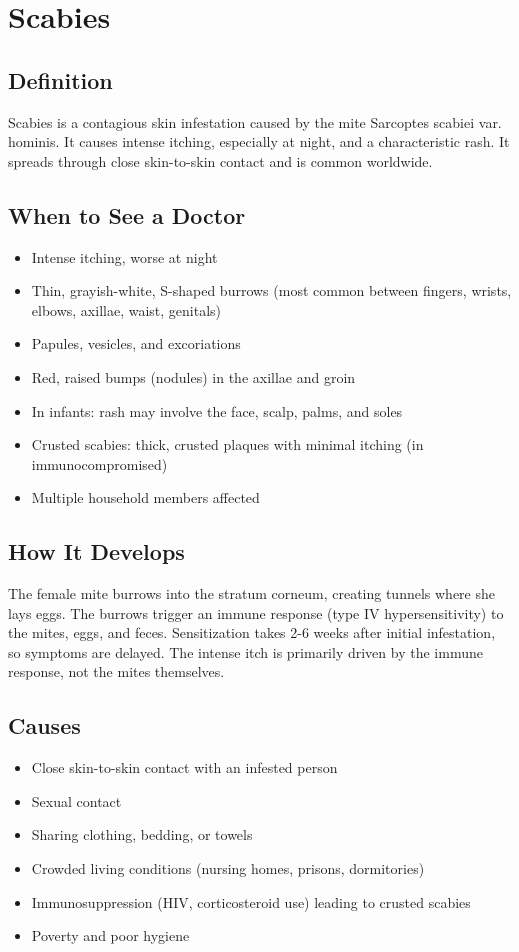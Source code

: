 \chapter{Scabies}

\section*{Definition}
Scabies is a contagious skin infestation caused by the mite Sarcoptes scabiei var. hominis. It causes intense itching, especially at night, and a characteristic rash. It spreads through close skin-to-skin contact and is common worldwide.

\section*{When to See a Doctor}
\begin{itemize}
\item Intense itching, worse at night
\item Thin, grayish-white, S-shaped burrows (most common between fingers, wrists, elbows, axillae, waist, genitals)
\item Papules, vesicles, and excoriations
\item Red, raised bumps (nodules) in the axillae and groin
\item In infants: rash may involve the face, scalp, palms, and soles
\item Crusted scabies: thick, crusted plaques with minimal itching (in immunocompromised)
\item Multiple household members affected
\end{itemize}

\section*{How It Develops}
The female mite burrows into the stratum corneum, creating tunnels where she lays eggs. The burrows trigger an immune response (type IV hypersensitivity) to the mites, eggs, and feces. Sensitization takes 2-6 weeks after initial infestation, so symptoms are delayed. The intense itch is primarily driven by the immune response, not the mites themselves.

\section*{Causes}
\begin{itemize}
\item Close skin-to-skin contact with an infested person
\item Sexual contact
\item Sharing clothing, bedding, or towels
\item Crowded living conditions (nursing homes, prisons, dormitories)
\item Immunosuppression (HIV, corticosteroid use) leading to crusted scabies
\item Poverty and poor hygiene
\end{itemize}

